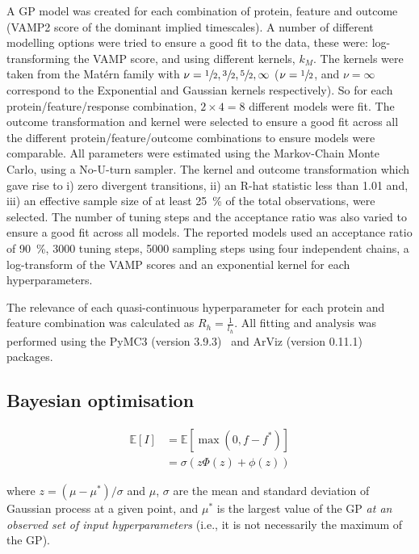 \documentclass[journal=jacsat,manuscript=article]{achemso}
\begin{document}
 A GP model was created for each combination of protein, feature and outcome (VAMP2 score of the dominant implied timescales). A number of different modelling options were tried to ensure a good fit to the data, these were: log-transforming the VAMP score, and using different kernels, $k_{M}$. The kernels were taken from the Mat\'ern family with $\nu=\sfrac{1}{2}, \sfrac{3}{2}, \sfrac{5}{2}, \infty$ ($\nu=\sfrac{1}{2}$, and $\nu=\infty$ correspond to the Exponential and Gaussian kernels respectively). So for each protein/feature/response combination, $2\times 4 =8$ different models were fit. The outcome transformation and kernel were selected to ensure a good fit across all the different protein/feature/outcome combinations to ensure models were comparable. All parameters were estimated using the Markov-Chain Monte Carlo, using a No-U-turn sampler. The kernel and outcome transformation which gave rise to i) zero divergent transitions, ii) an R-hat statistic less than 1.01 and,  iii) an effective sample size of at least \SI{25}{\percent} of the total observations,  were selected. The number of tuning steps and the acceptance ratio was also varied to ensure a good fit across all models. The reported models used an acceptance ratio of \SI{90}{\percent}, \num{3000} tuning steps, \num{5000} sampling steps using four independent chains, a log-transform of the VAMP scores and an exponential kernel for each hyperparameters. 
 
 The relevance of each quasi-continuous hyperparameter for each protein and feature combination was calculated as $R_{h} = \frac{1}{l_{h}}$. 
 All fitting and analysis was performed using the PyMC3 (version 3.9.3)~\cite{salvatierProbabilisticProgrammingPython2016} and ArViz (version 0.11.1)~\cite{arviz_2019} packages. 
 
 \subsection{Bayesian optimisation}
 
\begin{align}
 \mathbb{E}[I] &= \mathbb{E}[\max{(0, f-f^{*})}] \label{eqn:ei_def} \\ 
 & = \sigma \left ( z \Phi(z)  + \phi(z) \right) \label{eqn:ei_for_gp}
\end{align}

where $z = (\mu-\mu^{*})/\sigma$ and $\mu$, $\sigma$ are the mean and standard deviation of Gaussian process at a given point, and $\mu^{*}$ is the largest value of the GP \emph{at an observed set of input hyperparameters} (i.e., it is not necessarily the maximum of the GP). 
\end{document}
